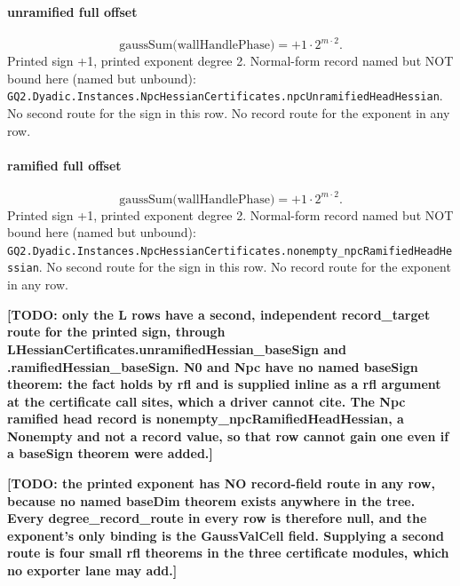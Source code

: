 \paragraph{unramified full offset}
\[\mathrm{gaussSum}\bigl(\mathrm{wallHandlePhase}\bigr)=+1\cdot 2^{m\cdot 2}.\]
Printed sign +1, printed exponent degree 2. Normal-form record named but NOT bound here (named but unbound): \texttt{GQ2.Dyadic.Instances.NpcHessianCertificates.npcUnramifiedHeadHessian}.
No second route for the sign in this row. No record route for the exponent in any row.
\paragraph{ramified full offset}
\[\mathrm{gaussSum}\bigl(\mathrm{wallHandlePhase}\bigr)=+1\cdot 2^{m\cdot 2}.\]
Printed sign +1, printed exponent degree 2. Normal-form record named but NOT bound here (named but unbound): \texttt{GQ2.Dyadic.Instances.NpcHessianCertificates.nonempty\_npcRamifiedHeadHessian}.
No second route for the sign in this row. No record route for the exponent in any row.
\par\noindent\textbf{[TODO: only the L rows have a second, independent record\_target route for the printed sign, through LHessianCertificates.unramifiedHessian\_baseSign and .ramifiedHessian\_baseSign. N0 and Npc have no named baseSign theorem: the fact holds by rfl and is supplied inline as a rfl argument at the certificate call sites, which a driver cannot cite. The Npc ramified head record is nonempty\_npcRamifiedHeadHessian, a Nonempty and not a record value, so that row cannot gain one even if a baseSign theorem were added.]}
\par\noindent\textbf{[TODO: the printed exponent has NO record-field route in any row, because no named baseDim theorem exists anywhere in the tree. Every degree\_record\_route in every row is therefore null, and the exponent's only binding is the GaussValCell field. Supplying a second route is four small rfl theorems in the three certificate modules, which no exporter lane may add.]}

